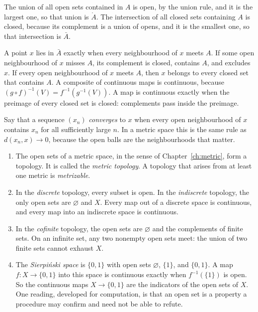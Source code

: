The union of all open sets contained in $A$ is open, by the union rule, and it is the largest one, so that union is $\mathring A$. The intersection of all closed sets containing $A$ is closed, because its complement is a union of opens, and it is the smallest one, so that intersection is $\bar A$.

A point $x$ lies in $\bar A$ exactly when every neighbourhood of $x$ meets $A$. If some open neighbourhood of $x$ misses $A$, its complement is closed, contains $A$, and excludes $x$. If every open neighbourhood of $x$ meets $A$, then $x$ belongs to every closed set that contains $A$. A composite of continuous maps is continuous, because $(g\circ f)^{-1}(V)=f^{-1}(g^{-1}(V))$. A map is continuous exactly when the preimage of every closed set is closed: complements pass inside the preimage.

Say that a sequence $(x_n)$ \emph{converges} to $x$ when every open neighbourhood of $x$ contains $x_n$ for all sufficiently large $n$. In a metric space this is the same rule as $d(x_n,x)\to0$, because the open balls are the neighbourhoods that matter.

\begin{example}\label{ex:topologies}
\begin{enumerate}[label=(\alph*)]
\item The open sets of a metric space, in the sense of Chapter~\ref{ch:metric}, form a topology. It is called the \emph{metric topology}. A topology that arises from at least one metric is \emph{metrizable}.
\item In the \emph{discrete} topology, every subset is open. In the \emph{indiscrete} topology, the only open sets are $\varnothing$ and $X$. Every map out of a discrete space is continuous, and every map into an indiscrete space is continuous.
\item In the \emph{cofinite} topology, the open sets are $\varnothing$ and the complements of finite sets. On an infinite set, any two nonempty open sets meet: the union of two finite sets cannot exhaust $X$.
\item The \emph{Sierpi\'nski space} is $\{0,1\}$ with open sets $\varnothing$, $\{1\}$, and $\{0,1\}$. A map $f:X\to\{0,1\}$ into this space is continuous exactly when $f^{-1}(\{1\})$ is open. So the continuous maps $X\to\{0,1\}$ are the indicators of the open sets of $X$. One reading, developed for computation, is that an open set is a property a procedure may confirm and need not be able to refute.
\end{enumerate}
\end{example}

